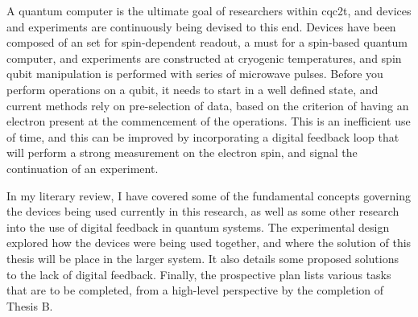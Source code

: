 A quantum computer is the ultimate goal of researchers within \gls{cqc2t}, and devices and experiments are continuously being devised to this end. Devices have been composed of an \gls{set} for spin-dependent readout, a must for a spin-based quantum computer, and experiments are constructed at cryogenic temperatures, and spin qubit manipulation is performed with series of microwave pulses. Before you perform operations on a qubit, it needs to start in a well defined state, and current methods rely on pre-selection of data, based on the criterion of having an electron present at the commencement of the operations. This is an inefficient use of time, and this can be improved by incorporating a digital feedback loop that will perform a strong measurement on the electron spin, and signal the continuation of an experiment.

In my literary review, I have covered some of the fundamental concepts governing the devices being used currently in this research, as well as some other research into the use of digital feedback in quantum systems.
The experimental design explored how the devices were being used together, and where the solution of this thesis will be place in the larger system. It also details some proposed solutions to the lack of digital feedback.
Finally, the prospective plan lists various tasks that are to be completed, from a high-level perspective by the completion of Thesis B.